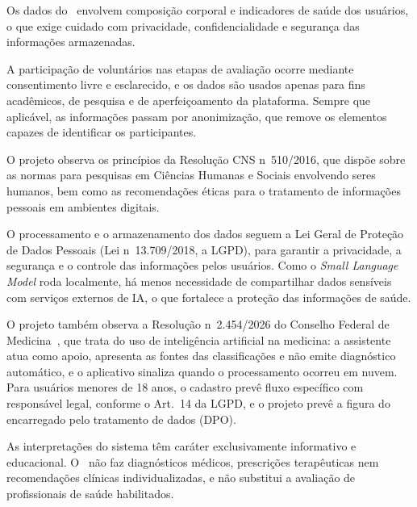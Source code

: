 Os dados do \sintonia\ envolvem composição corporal e indicadores de saúde dos usuários, o
que exige cuidado com privacidade, confidencialidade e segurança das informações
armazenadas.

A participação de voluntários nas etapas de avaliação ocorre mediante consentimento livre e
esclarecido, e os dados são usados apenas para fins acadêmicos, de pesquisa e de
aperfeiçoamento da plataforma. Sempre que aplicável, as informações passam por anonimização,
que remove os elementos capazes de identificar os participantes.

O projeto observa os princípios da Resolução CNS n\textordmasculine\ 510/2016, que dispõe
sobre as normas para pesquisas em Ciências Humanas e Sociais envolvendo seres humanos, bem
como as recomendações éticas para o tratamento de informações pessoais em ambientes
digitais.

O processamento e o armazenamento dos dados seguem a Lei Geral de Proteção de Dados Pessoais
(Lei n\textordmasculine\ 13.709/2018, a LGPD), para garantir a privacidade, a segurança e o
controle das informações pelos usuários. Como o \emph{Small Language Model} roda localmente,
há menos necessidade de compartilhar dados sensíveis com serviços externos de IA, o que
fortalece a proteção das informações de saúde.

O projeto também observa a Resolução n\textordmasculine\ 2.454/2026 do Conselho Federal de
Medicina~\cite{cfm2026}, que trata do uso de inteligência artificial na medicina: a assistente atua como
apoio, apresenta as fontes das classificações e não emite diagnóstico automático, e o
aplicativo sinaliza quando o processamento ocorreu em nuvem. Para usuários menores de 18
anos, o cadastro prevê fluxo específico com responsável legal, conforme o Art.~14 da LGPD, e
o projeto prevê a figura do encarregado pelo tratamento de dados (DPO).

As interpretações do sistema têm caráter exclusivamente informativo e educacional. O
\sintonia\ não faz diagnósticos médicos, prescrições terapêuticas nem recomendações clínicas
individualizadas, e não substitui a avaliação de profissionais de saúde habilitados.

